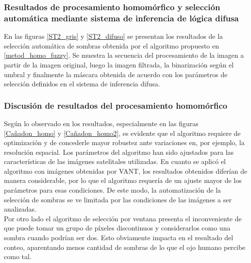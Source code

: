 \subsubsection{Resultados de procesamiento homomórfico y selección automática mediante sistema de inferencia de lógica difusa} \label{resultados homo difusa}
En las figuras \ref{ST2_gris} y \ref{ST2_difuso} se presentan los resultados de la selección automática de sombras obtenida por el algoritmo propuesto en \ref{metod_homo_fuzzy}.
Se muestra la secuencia del procesamiento de la imagen a partir de la imagen original, luego la imagen filtrada, la binarización según el umbral y finalmente la máscara obtenida de acuerdo con los parámetros de selección definidos en el sistema de inferencia difusa.



\subsubsection{Discusión de resultados del procesamiento homomórfico}

Según lo observado en los resultados, especialmente en las figuras \ref{Cañadon_homo} y \ref{Cañadon_homo2}, es evidente que el algoritmo requiere de optimización y de concederle mayor robustez ante variaciones en, por ejemplo, la resolución espacial. Los parámetros del algoritmo han sido ajustados para las características de las imágenes satelitales utilizadas. En cuanto se aplicó el algoritmo con imágenes obtenidas por VANT, los resultados obtenidos diferían de manera considerable, por lo que el algoritmo requería de un ajuste mayor de los parámetros para esas condiciones. De este modo, la automatización de la selección de sombras se ve limitada por las condiciones de las imágenes a ser analizadas.\\
Por otro lado el algoritmo de selección por ventana presenta el inconveniente de que puede tomar un grupo de píxeles discontinuos y considerarlos como una sombra cuando podrían ser dos. Esto obviamente impacta en el resultado del conteo, aparentando menos cantidad de sombras de lo que el ojo humano percibe como tal.                                                                                                                              

